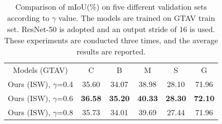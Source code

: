 \documentclass[final]{latex/cvpr}
\newcommand{\drule}{\specialrule{0.2pt}{1pt}{1pt}\specialrule{0.2pt}{0pt}{\belowrulesep}}
\begin{document}
\begin{table}[h!]
\vspace{-0.0cm}
\begin{center}
\footnotesize
\begin{tabular}{c|c|c|c|c||c}
\toprule
Models (GTAV) & C & B & M & S & G \\
\drule
Ours (ISW), $\gamma$=0.4 & 35.60 & 34.07 & 38.98 &  28.10 & 71.96      \\ 
\midrule
Ours (ISW), $\gamma$=0.6 & \textbf{36.58} & \textbf{35.20}  & \textbf{40.33}   & \textbf{28.30}   &   \textbf{72.10}   \\ 
\midrule
Ours (ISW), $\gamma$=0.8 & 35.73 & 34.01 & 39.69  &  27.44   &  71.96 \\ 
\bottomrule
\end{tabular}
\end{center}
\vspace*{-0.2cm}
\caption{Comparison of mIoU(\%) on five different validation sets according to $\gamma$ value. The models are trained on GTAV train set. ResNet-50 is adopted and an output stride of 16 is used. These experiments are conducted three times, and the average results are reported.}
\label{tab_hyper_parameters3}
\vspace{-0.1cm}
\end{table}

\vspace*{-0.2cm}
\end{document}
